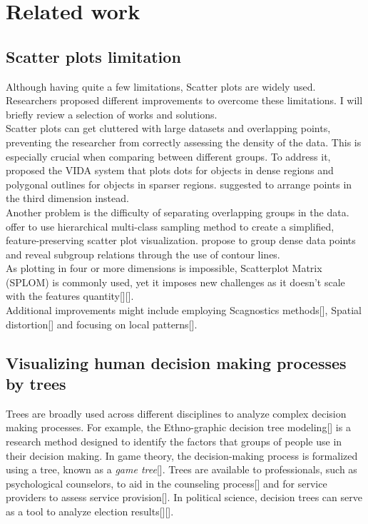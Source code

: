 \documentclass[11pt]{article}
\begin{document}
\section{Related work}\label{Related work}
\subsection{Scatter plots limitation}\label{Scatter plots limitation}
Although having quite a few limitations, Scatter plots are widely used. Researchers proposed different improvements to overcome these limitations. I will briefly review a selection of works and solutions.\\
Scatter plots can get cluttered with large datasets and overlapping points, preventing the researcher from correctly assessing the density of the data. This is especially crucial when comparing between different groups. To address it, \cite{woodruff1998constant} proposed the VIDA system that plots dots for objects in dense regions and polygonal outlines for objects in sparser regions. \cite{dang2010stacking} suggested to arrange points in the third dimension instead.\\
Another problem is the difficulty of separating overlapping groups in the data. \cite{lee2012ieee} offer to use hierarchical multi-class sampling method to create a simplified, feature-preserving scatter plot visualization. \cite{mayorga2013splatterplots} propose to group dense data points and reveal subgroup relations through the use of contour lines.\\
As plotting in four or more dimensions is impossible, Scatterplot Matrix (SPLOM) is commonly used, yet it imposes new challenges as it doesn’t scale with the features quantity[][].\\
Additional improvements might include employing Scagnostics methods[], Spatial distortion[] and focusing on local patterns[].
\subsection{Visualizing human decision making processes by trees
}\label{Visualizing decision making processes by trees}
Trees are broadly used across different disciplines to analyze complex decision making processes. For example, the Ethno-graphic decision tree modeling[] is a research method designed to identify the factors that groups of people use in their decision making. In game theory, the decision-making process is formalized using a tree, known as a \textit{game tree}[]. Trees are available to professionals, such as psychological counselors, to aid in the counseling process[] and for service providers to assess service provision[]. In political science, decision trees can serve as a tool to analyze election results[][].
\end{document}
